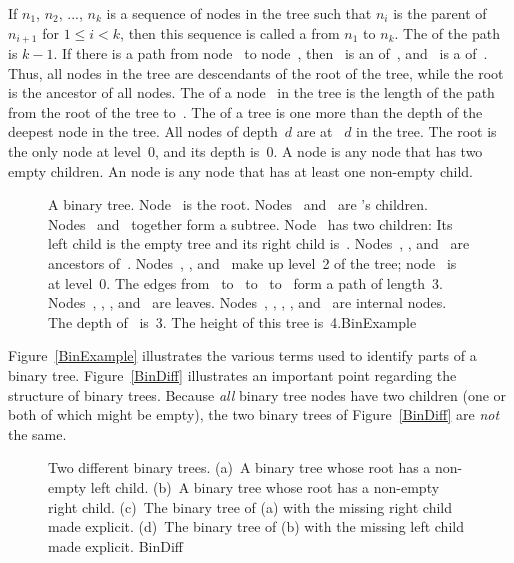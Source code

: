 If \(n_1\), \(n_2\), ..., \(n_k\) is a sequence of nodes in the tree such
that \(n_i\) is the parent of \(n_{i+1}\) for \(1 \leq i < k\), then this
sequence is called a  from \(n_1\) to \(n_k\).
The  of the path is \(k-1\).
If there is a path from node~ to node~,
then ~is an  of~, and
~is a  of~.
Thus, all nodes in the tree are descendants of the root of the tree,
while the root is the ancestor of all nodes.
The  of a node~ in the tree is the length of the
path from the root of the tree to~.
The  of a tree is one more than the depth of the deepest
node in the tree.
All nodes of depth~\(d\) are at
~\(d\) in the tree.
The root is the only node at level~0, and its depth is~0.
A  node is any node that has two empty children.
An  node is
any node that has at least one non-empty child.

\begin{figure}

\medskip
{}
{A binary tree.
Node~ is the root.
Nodes~ and~ are 's children.
Nodes~ and~ together form a subtree.
Node~ has two children: Its left child is the empty tree and
its right child is~.
Nodes~, , and~ are ancestors of~.
Nodes~, , and~ make up level~2 of the tree;
node~ is at level~0.
The edges from~ to~ to~ to~
form a path of length~3.
Nodes~, , , and~ are leaves.
Nodes~, , , , and~ are internal
nodes.
The depth of~ is~3.
The height of this tree is~4.}{BinExample}
\bigskip\smallskip
\end{figure}

\vspace{-\smallskipamount}
Figure~\ref{BinExample} illustrates the various terms used to identify 
parts of a binary tree.
Figure~\ref{BinDiff} illustrates an important point regarding the
structure of binary trees.
Because \emph{all} binary tree nodes have two children
(one or both of which might be empty), the two binary
trees of Figure~\ref{BinDiff} are \emph{not} the same.

\begin{figure}
\vspace{-\medskipamount}

{Two different binary trees.
(a)~A binary tree whose root has a non-empty left child.
(b)~A binary tree whose root has a non-empty right child.
(c)~The binary tree of (a) with the missing right child made explicit.
(d)~The binary tree of (b) with the missing left child made explicit.}
{BinDiff}
\bigskip
\end{figure}


